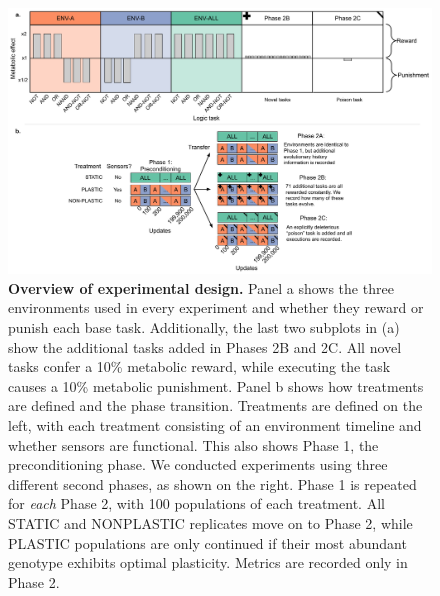 \begin{figure}[h!]
    \centering
    \includegraphics[width=1\textwidth]{media/conceptual_figure.pdf}
    \caption{\small
    \textbf{Overview of experimental design.}
    Panel a shows the three environments used in every experiment and whether they reward or punish each base task. 
    Additionally, the last two subplots in (a) show the additional tasks added in Phases 2B and 2C. 
    All novel tasks confer a 10\% metabolic reward, while executing the  task causes a 10\% metabolic punishment. 
    Panel b shows how treatments are defined and the phase transition. 
    Treatments are defined on the left, with each treatment consisting of an environment timeline and whether sensors are functional. 
    This also shows Phase 1, the preconditioning phase.  
    We conducted experiments using three different second phases, as shown on the right. 
    Phase 1 is repeated for \textit{each} Phase 2, with 100 populations of each treatment. 
    All STATIC and NONPLASTIC replicates move on to Phase 2, while PLASTIC populations are only continued if their most abundant genotype exhibits optimal plasticity. 
    Metrics are recorded only in Phase 2. 
    }
    \label{fig:conceptual-figure}
\end{figure}